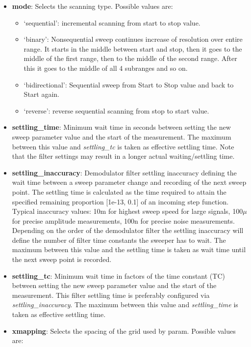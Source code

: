 \documentclass[11pt]{article} %
\begin{document}
\begin{itemize}
\item {\bf mode}: Selects the scanning type. Possible values are:
	\begin{itemize}[]
	\itemsep0pt
	\item `sequential': incremental scanning from start to stop value.
	\item `binary': Nonsequential sweep continues increase of resolution over entire range. It starts in the middle between start and stop, then it goes to the middle of the first range, then to the middle of the second range. After this it goes to the middle of all 4 subranges and so on.
	\item `bidirectional': Sequential sweep from Start to Stop value and back to Start again.
	\item `reverse': reverse sequential scanning from stop to start value.
	\end{itemize}
\item {\bf settling\_time}: Minimum wait time in seconds between setting the new sweep parameter value and the start of the measurement. The maximum between this value and {\it settling\_tc} is taken as effective settling time. Note that the filter settings may result in a longer actual waiting/settling time.
\item {\bf settling\_inaccuracy}: Demodulator filter settling inaccuracy defining the wait time between a sweep parameter change and recording of the next sweep point. The settling time is calculated as the time required to attain the specified remaining proportion [1e-13, 0.1] of an incoming step function. Typical inaccuracy values: 10m for highest sweep speed for large signals, 100$\mu$ for precise amplitude measurements, 100n for precise noise measurements. Depending on the order of the demodulator filter the settling inaccuracy will define the number of filter time constants the sweeper has to wait. The maximum between this value and the settling time is taken as wait time until the next sweep point is recorded.
\item {\bf settling\_tc}: Minimum wait time in factors of the time constant (TC) between setting the new sweep parameter value and the start of the measurement. This filter settling time is preferably configured via {\it settling\_inaccuracy}. The maximum between this value and {\it settling\_time} is taken as effective settling time.
\item {\bf xmapping}: Selects the spacing of the grid used by param. Possible values are:
	\begin{itemize}[]
	\itemsep0pt

\end{itemize}
\end{itemize}
\end{document}
